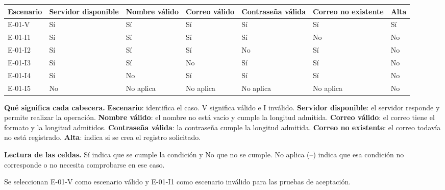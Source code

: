 \begingroup\fontsize{7.8}{11}\selectfont\setlength{\tabcolsep}{3pt}
\begin{tabularx}{\linewidth}{@{}*{7}{Y}@{}}\toprule
\textbf{Escenario} & \textbf{Servidor disponible} & \textbf{Nombre válido} & \textbf{Correo válido} & \textbf{Contraseña válida} & \textbf{Correo no existente} & \textbf{Alta}\\\midrule
E-01-V & Sí & Sí & Sí & Sí & Sí & Sí\\[3pt]
E-01-I1 & Sí & Sí & Sí & Sí & No & No\\[3pt]
E-01-I2 & Sí & Sí & Sí & No & Sí & No\\[3pt]
E-01-I3 & Sí & Sí & No & Sí & Sí & No\\[3pt]
E-01-I4 & Sí & No & Sí & Sí & Sí & No\\[3pt]
E-01-I5 & No & No aplica & No aplica & No aplica & No aplica & No\\[3pt]
\bottomrule\end{tabularx}\endgroup\par
{\fontsize{9}{11}\selectfont\textbf{Qué significa cada cabecera.} \textbf{Escenario}: identifica el caso. V significa válido e I inválido. \textbf{Servidor disponible}: el servidor responde y permite realizar la operación. \textbf{Nombre válido}: el nombre no está vacío y cumple la longitud admitida. \textbf{Correo válido}: el correo tiene el formato y la longitud admitidos. \textbf{Contraseña válida}: la contraseña cumple la longitud admitida. \textbf{Correo no existente}: el correo todavía no está registrado. \textbf{Alta}: indica si se crea el registro solicitado.\par\textbf{Lectura de las celdas.} Sí indica que se cumple la condición y No que no se cumple. No aplica (--) indica que esa condición no corresponde o no necesita comprobarse en ese caso.\par}


Se seleccionan E-01-V como escenario válido y E-01-I1 como escenario inválido para las pruebas de aceptación.\par


